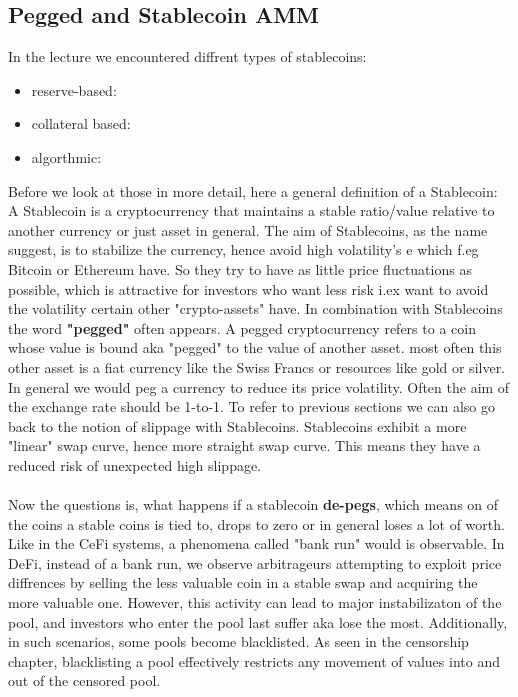 \documentclass{article}
\begin{document}
\subsection{Pegged and Stablecoin AMM} 
In the lecture we encountered diffrent types of stablecoins: 
\begin{itemize}
    \item {reserve-based}: 
    \item {collateral based}: 
    \item { algorthmic}:  
\end{itemize}
Before we look at those in more detail, here a general definition of a Stablecoin: A Stablecoin is a cryptocurrency that maintains a stable ratio/value relative to another currency or just asset in general. The aim of Stablecoins, as the name suggest, is to stabilize the currency, hence avoid high volatility's e which f.eg Bitcoin or Ethereum have. So they try to have as little price fluctuations as possible, which is attractive for investors who want less risk i.ex want to avoid the volatility certain other "crypto-assets" have.
In combination with Stablecoins the word  \textbf{"pegged" }often appears. A pegged cryptocurrency refers to a coin whose value is bound aka "pegged" to the value of another asset. most often this other asset is a fiat currency like the Swiss Francs or resources like gold or silver. In general we would peg a currency to reduce its price volatility. Often the aim of the exchange rate should be 1-to-1.
To refer to previous sections we can also go back to the notion of slippage with Stablecoins. Stablecoins exhibit a more "linear" swap curve, hence more straight swap curve. This means they have a reduced risk of unexpected high slippage.
\\ \\
Now the questions is, what happens if a stablecoin \textbf{de-pegs}, which means on of the coins a stable coins is tied to, drops to zero or in general loses a lot of worth. Like in the CeFi systems, a phenomena called "bank run" would is observable. In DeFi, instead of a bank run, we observe arbitrageurs attempting to exploit price diffrences by selling the less valuable coin in a stable swap and acquiring the more valuable one. However, this activity can lead to major instabilizaton of the pool, and investors who enter the pool last suffer aka lose the most. Additionally, in such scenarios, some pools become blacklisted. As seen in the censorship chapter, blacklisting a pool effectively restricts any movement of values into and out of the censored pool.
\end{document}
